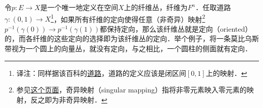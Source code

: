 



令$p: E\to X$是一个唯一地定义在空间$X$上的纤维丛，纤维为$F^n$．任取道路$\gamma: (0, 1)\to X$\footnote{译注：同样据该百科的\href{https://encyclopediaofmath.org/wiki/Path}{道路}，道路的定义应该是闭区间$[0, 1]$上的映射．}，如果所有纤维的定向使得任意（非奇异）映射\footnote{参见\href{https://solitaryroad.com/c218.html}{这个页面}，奇异映射（singular mapping）指将非零元素映入零元素的映射，反之即为非奇异映射．}$p^{-1}(\gamma(0))\to p^{-1}(\gamma(1))$都保持定向，那么该纤维丛就是定向（oriented）的，而各纤维的这些定向的选择即为该纤维丛的定向．举个例子，将一条莫比乌斯带视为一个圆上的向量丛，就没有定向，与之相比，一个圆柱的侧面就有定向．






